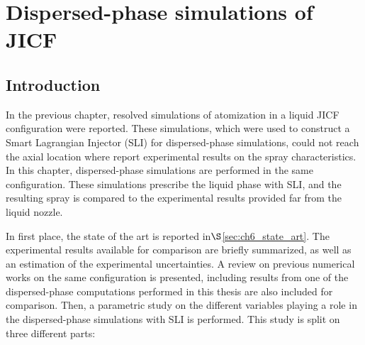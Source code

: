 \chapter{Dispersed-phase simulations of JICF}
	\label{ch6:jicf_lgs_simulations}


%
%
%	
%	
%	
%	
%


\section{Introduction}

In the previous chapter, resolved simulations of atomization in a liquid JICF configuration were reported. These simulations, which were used to construct a Smart Lagrangian Injector (SLI) for dispersed-phase simulations, could not reach the axial location where  report experimental results on the spray characteristics. In this chapter, dispersed-phase simulations are performed in the same configuration. These simulations prescribe the liquid phase with SLI, and the resulting spray is compared to the experimental results provided far from the liquid nozzle.

In first place, the state of the art is reported in$\S$\ref{sec:ch6_state_art}. The experimental results available for comparison are briefly summarized, as well as an estimation of the experimental uncertainties. A review on previous numerical works on the same configuration is presented, including results from one of the dispersed-phase computations performed in this thesis are also included for comparison. Then, a parametric study on the different variables playing a role in the dispersed-phase simulations with SLI is performed. This study is split on three different parts:

